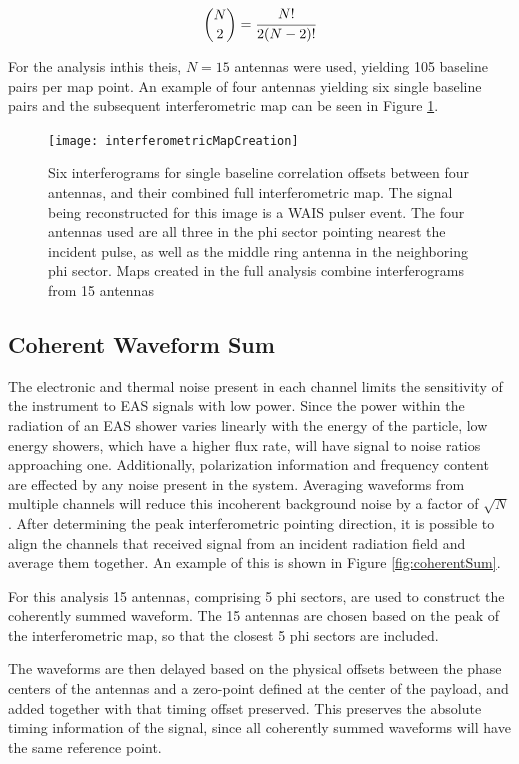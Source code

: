	\begin{equation}
	{{N}\choose{2}} = \cfrac{N!}{2(N-2)!}
	\label{eqn:binomial}
	\end{equation}
		
		For the analysis inthis theis, $N=15$ antennas were used, yielding 105 baseline pairs per map point.  An example of four antennas yielding six single baseline pairs and the subsequent interferometric map can be seen in Figure \ref{fig:mapCreation}.
		
\begin{figure}
\centering
	\texttt{[image: interferometricMapCreation]}
	\caption{Six interferograms for single baseline correlation offsets between four antennas, and their combined full interferometric map.  The signal being reconstructed for this image is a WAIS pulser event.  The four antennas used are all three in the phi sector pointing nearest the incident pulse, as well as the middle ring antenna in the neighboring phi sector.  Maps created in the full analysis combine interferograms from 15 antennas}
	\label{fig:mapCreation}
\end{figure}
		
		
	\subsection{Coherent Waveform Sum}
		The electronic and thermal noise present in each channel limits the sensitivity of the instrument to EAS signals with low power.  Since the power within the radiation of an EAS shower varies linearly with the energy of the particle, low energy showers, which have a higher flux rate, will have signal to noise ratios approaching one.  Additionally, polarization information and frequency content are effected by any noise present in the system.  Averaging waveforms from multiple channels will reduce this incoherent background noise by a factor of $\sqrt{N}$.  After determining the peak interferometric pointing direction, it is possible to align the channels that received signal from an incident radiation field and average them together.  An example of this is shown in Figure \ref{fig:coherentSum}.
		
		For this analysis 15 antennas, comprising 5 phi sectors, are used to construct the coherently summed waveform.  The 15 antennas are chosen based on the peak of the interferometric map, so that the closest 5 phi sectors are included.  
		
		The waveforms are then delayed based on the physical offsets between the phase centers of the antennas and a zero-point defined at the center of the payload, and added together with that timing offset preserved.  This preserves the absolute timing information of the signal, since all coherently summed waveforms will have the same reference point.
		
